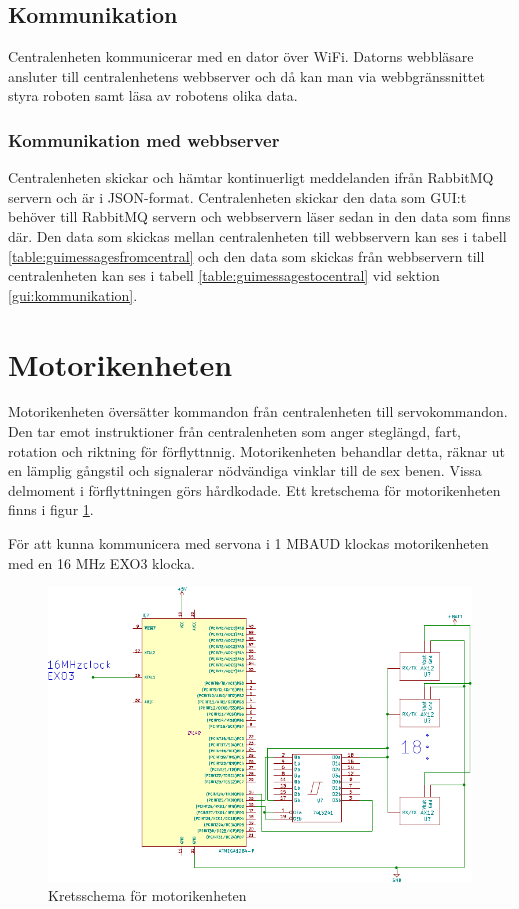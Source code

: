 \documentclass[a4paper,titlepage,12pt]{article}
\begin{document}
	\subsection{Kommunikation}
	Centralenheten kommunicerar med en dator över WiFi. Datorns webbläsare 
	ansluter till centralenhetens webbserver och då kan man
	via webbgränssnittet styra roboten samt läsa av robotens olika data. 
		
	\subsubsection{Kommunikation med webbserver}
	Centralenheten skickar och hämtar kontinuerligt meddelanden ifrån RabbitMQ servern och är i JSON-format. Centralenheten skickar den data som GUI:t
	behöver till RabbitMQ servern och webbservern läser sedan in den data som finns där.
	Den data som skickas mellan centralenheten till webbservern kan ses i
	tabell \ref{table:guimessagesfromcentral} och den data som skickas från webbservern till centralenheten kan ses i tabell \ref{table:guimessagestocentral} vid sektion \ref{gui:kommunikation}.


    \newpage
	\section{Motorikenheten}
	Motorikenheten översätter kommandon från centralenheten till servokommandon. Den tar emot 
	instruktioner från centralenheten som anger steglängd, fart, rotation och riktning för 
	förflyttnnig. Motorikenheten behandlar detta, räknar ut en lämplig gångstil och 
	signalerar nödvändiga vinklar till de sex benen. Vissa delmoment i förflyttningen 
	görs hårdkodade. Ett kretschema för motorikenheten finns i figur \ref{fig:motorik}.

	För att kunna kommunicera med servona i 1 MBAUD klockas motorikenheten med en 16 MHz 
	EXO3 klocka.

	\begin{figure}[htpb]
		\centering
		\includegraphics[width=0.6\linewidth]{charts/motor/motorik.pdf}
		\caption{Kretsschema för motorikenheten}
		\label{fig:motorik}
	\end{figure}
	
\end{document}
